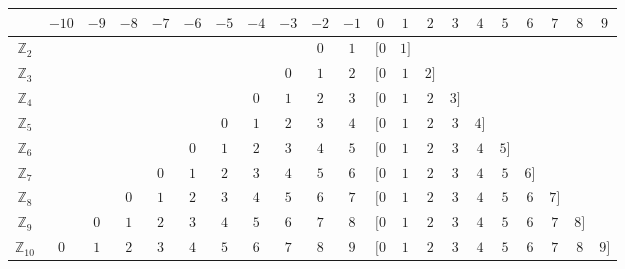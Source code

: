 \begin{table}[h]
\begin{tabular}{c|cccccccccccccccccccc}
& $-10$ & $-9$ & $-8$ & $-7$ & $-6$ & $-5$ & $-4$ & $-3$ & $-2$ & $-1$ & $0$ & $1$ & $2$ & $3$ & $4$ & $5$ & $6$ & $7$ & $8$ & $9$\\
\hline
$\mathbb{Z}_2$ & & & & & & & & & $0$ & $1$ & $[0$ & $1]$ & & & & & & & &\\
\hline
$\mathbb{Z}_3$ & & & & & & & & $0$ & $1$ & $2$ & $[0$ & $1$ & $2]$ & & & & & & &\\
\hline
$\mathbb{Z}_4$ & & & & & & & $0$ & $1$ & $2$ & $3$ & $[0$ & $1$ & $2$ & $3]$ & & & & & &\\
\hline
$\mathbb{Z}_5$ & & & & & & $0$ & $1$ & $2$ & $3$ & $4$ & $[0$ & $1$ & $2$ & $3$ & $4]$ & & & & &\\
\hline
$\mathbb{Z}_6$ & & & & & $0$ & $1$ & $2$ & $3$ & $4$ & $5$ & $[0$ & $1$ & $2$ & $3$ & $4$ & $5]$ & & & &\\
\hline
$\mathbb{Z}_7$ & & & & $0$ & $1$ & $2$ & $3$ & $4$ & $5$ & $6$ & $[0$ & $1$ & $2$ & $3$ & $4$ & $5$ & $6]$ & & &\\
\hline
$\mathbb{Z}_8$ & & & $0$ & $1$ & $2$ & $3$ & $4$ & $5$ & $6$ & $7$ & $[0$ & $1$ & $2$ & $3$ & $4$ & $5$ & $6$ & $7]$ & &\\
\hline
$\mathbb{Z}_9$ & & $0$ & $1$ & $2$ & $3$ & $4$ & $5$ & $6$ & $7$ & $8$ & $[0$ & $1$ & $2$ & $3$ & $4$ & $5$ & $6$ & $7$ & $8]$ &\\
\hline
$\mathbb{Z}_{10}$ & $0$ & $1$ & $2$ & $3$ & $4$ & $5$ & $6$ & $7$ & $8$ & $9$ & $[0$ & $1$ & $2$ & $3$ & $4$ & $5$ & $6$ & $7$ & $8$ & $9]$\\
\end{tabular}
\end{table}
